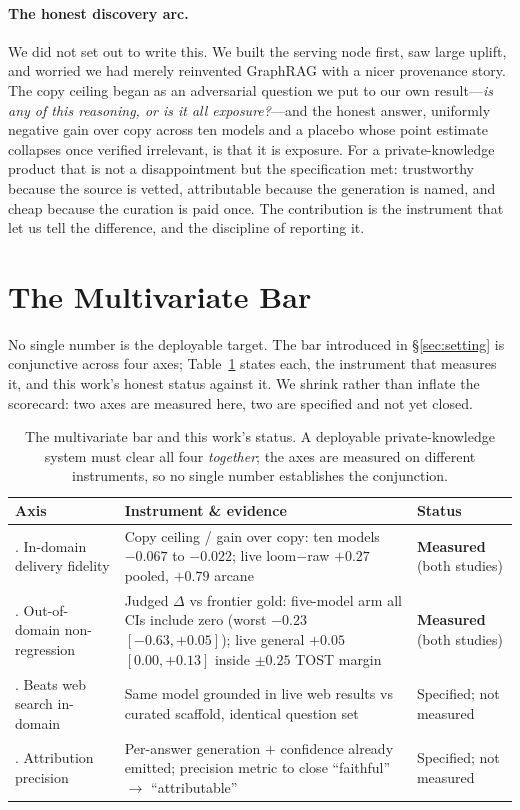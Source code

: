 \documentclass[10pt,twocolumn]{article}
\begin{document}
\paragraph{The honest discovery arc.} We did not set out to write this. We built the serving node
first, saw large uplift, and worried we had merely reinvented GraphRAG with a nicer provenance story.
The copy ceiling began as an adversarial question we put to our own result---\emph{is any of this
reasoning, or is it all exposure?}---and the honest answer, uniformly negative gain over copy across
ten models and a placebo whose point estimate collapses once verified irrelevant, is that it is exposure. For a
private-knowledge product that is not a disappointment but the specification met: trustworthy because
the source is vetted, attributable because the generation is named, and cheap because the curation is
paid once. The contribution is the instrument that let us tell the difference, and the discipline of
reporting it.

\section{The Multivariate Bar}\label{sec:bar}
No single number is the deployable target. The bar introduced in \S\ref{sec:setting} is conjunctive
across four axes; Table~\ref{tab:bar} states each, the instrument that measures it, and this work's
honest status against it. We shrink rather than inflate the scorecard: two axes are measured here, two
are specified and not yet closed.

\begin{table}[t]\centering\small
\caption{The multivariate bar and this work's status. A deployable private-knowledge system must clear
all four \emph{together}; the axes are measured on different instruments, so no single number
establishes the conjunction.}
\label{tab:bar}
\renewcommand{\arraystretch}{1.2}
\begin{tabularx}{\textwidth}{@{}>{\raggedright\arraybackslash}p{3.5cm} >{\raggedright\arraybackslash}X >{\raggedright\arraybackslash}p{3.6cm}@{}}
\toprule
Axis & Instrument \& evidence & Status \\
\midrule
1. In-domain delivery fidelity & Copy ceiling / gain over copy: ten models $-0.067$ to $-0.022$; live loom$-$raw $+0.27$ pooled, $+0.79$ arcane & \textbf{Measured} (both studies) \\
2. Out-of-domain non-regression & Judged $\Delta$ vs frontier gold: five-model arm all CIs include zero (worst $-0.23$ $[-0.63,+0.05]$); live general $+0.05$ $[0.00,+0.13]$ inside $\pm0.25$ TOST margin & \textbf{Measured} (both studies) \\
3. Beats web search in-domain & Same model grounded in live web results vs curated scaffold, identical question set & Specified; not measured \\
4. Attribution precision & Per-answer generation $+$ confidence already emitted; precision metric to close ``faithful'' $\to$ ``attributable'' & Specified; not measured \\
\bottomrule
\end{tabularx}
\end{table}
\end{document}
